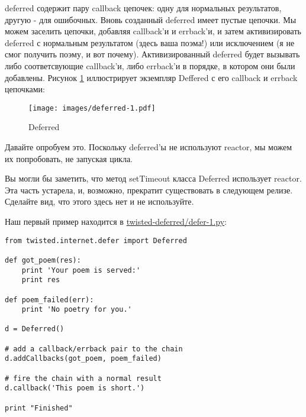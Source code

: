 deferred содержит пару callback цепочек: одну для нормальных 
результатов, другую - для ошибочных. Вновь созданный deferred 
имеет пустые цепочки. Мы можем заселить цепочки, добавляя callback'и и 
errback'и, и затем активизировать deferred с нормальным результатом (здесь ваша поэма!) 
или исключением (я не смог получить поэму, и вот почему). Активизированный  
deferred будет вызывать либо соответсвующие callback'и, либо 
errback'и в порядке, в котором они были добавлены. Рисунок \ref{fig:deferred-1} 
иллюстрирует экземпляр Deffered с его callback и errback цепочками:

\begin{figure}[h]
\begin{center}
    \texttt{[image: images/deferred-1.pdf]}
    \caption{Deferred\label{fig:deferred-1}}
\end{center}
\end{figure}

\eject

Давайте опробуем это. Поскольку deferred'ы не используют 
reactor, мы можем их попробовать, не запуская цикла.


Вы могли бы заметить, что метод setTimeout класса Deferred 
использует reactor. Эта часть устарела, и, возможно, прекратит существовать 
в следующем релизе. Сделайте вид, что этого здесь нет и не 
используйте.


Наш первый пример находится в 
\href{http://github.com/jdavisp3/twisted-intro/blob/master/twisted-deferred/defer-1.py}{twisted-deferred/defer-1.py}:

 \begin{verbatim}
from twisted.internet.defer import Deferred

def got_poem(res):
    print 'Your poem is served:'
    print res

def poem_failed(err):
    print 'No poetry for you.'

d = Deferred()

# add a callback/errback pair to the chain
d.addCallbacks(got_poem, poem_failed)

# fire the chain with a normal result
d.callback('This poem is short.')

print "Finished"
\end{verbatim} 


